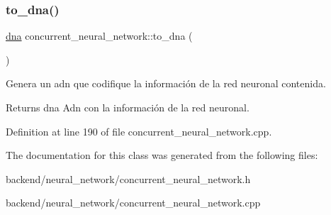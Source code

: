 \subsubsection{\texorpdfstring{to\+\_\+dna()}{to\_dna()}}
{\footnotesize\ttfamily \mbox{\hyperlink{structdna}{dna}} concurrent\+\_\+neural\+\_\+network\+::to\+\_\+dna (\begin{DoxyParamCaption}{ }\end{DoxyParamCaption})}



Genera un adn que codifique la información de la red neuronal contenida. 

\begin{DoxyReturn}{Returns}
dna Adn con la información de la red neuronal. 
\end{DoxyReturn}


Definition at line 190 of file concurrent\+\_\+neural\+\_\+network.\+cpp.



The documentation for this class was generated from the following files\+:\begin{DoxyCompactItemize}
\item 
backend/neural\+\_\+network/concurrent\+\_\+neural\+\_\+network.\+h\item 
backend/neural\+\_\+network/concurrent\+\_\+neural\+\_\+network.\+cpp\end{DoxyCompactItemize}
